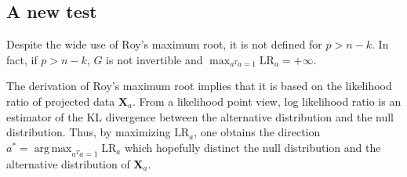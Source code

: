 \documentclass[12pt]{article} %
\DeclareMathOperator*{\argmax}{arg\,max}
\newcommand{\bX}{\mathbf{X}}
\theoremstyle{definition}
\begin{document}


\subsection{A new test}
Despite the wide use of Roy's maximum root, it is not defined for $p> n-k$.
In fact, if $p>n-k$, $G$ is not invertible and $\max_{a^T a=1}\text{LR}_a=+\infty$. 

The derivation of Roy's maximum root implies that it is based on the likelihood ratio of projected data $\bX_a$.
From a likelihood point view, log likelihood ratio is an estimator of the KL divergence between the alternative distribution and the null distribution.
Thus, by maximizing $\text{LR}_a$, one obtains
the direction $a^*=\argmax_{a^T a=1}\text{LR}_a$ which hopefully distinct the null distribution and the alternative distribution of $\bX_a$. 


\end{document}
